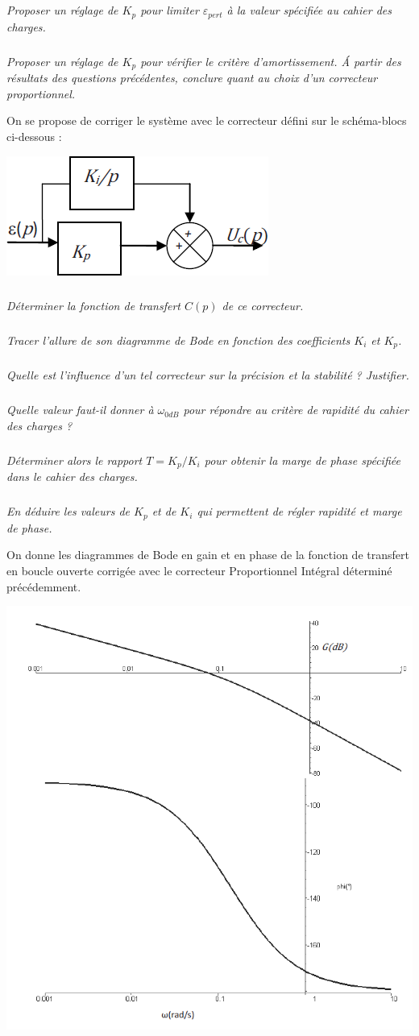 \documentclass[10pt,fleqn]{article} %
\begin{document}
\subparagraph{}
\textit{Proposer un réglage de $K_p$ pour limiter $\varepsilon_{pert}$ à la valeur spécifiée au cahier des charges.}

\subparagraph{}
\textit{Proposer un réglage de $K_p$ pour vérifier le critère d’amortissement. \'A partir des résultats des questions précédentes, conclure quant au choix d’un correcteur proportionnel.}

On se propose de corriger le système avec le correcteur défini sur le schéma-blocs ci-dessous :
\begin{center}
\includegraphics[width=.4\linewidth]{images_02/fig_07}
\end{center}


\subparagraph{}
\textit{Déterminer la fonction de transfert $C(p)$ de ce correcteur.}

\subparagraph{}
\textit{Tracer l’allure de son diagramme de Bode en fonction des coefficients $K_i$ et $K_p$.}

\subparagraph{}
\textit{Quelle est l’influence d’un tel correcteur sur la précision et la stabilité ? Justifier.}

\subparagraph{}
\textit{Quelle valeur faut-il donner à $\omega_{0dB}$ pour répondre au critère de rapidité du cahier des charges ?}

\subparagraph{}
\textit{Déterminer alors le rapport $T=K_p/K_i$ pour obtenir la marge de phase spécifiée dans le cahier des charges.}

\subparagraph{}
\textit{En déduire les valeurs de $K_p$ et de $K_i$ qui permettent de régler rapidité et marge de phase.}


On donne les diagrammes de Bode en gain et en phase de la fonction de transfert en boucle ouverte corrigée avec le correcteur Proportionnel Intégral déterminé précédemment.

\begin{center}
\includegraphics[width=.8\linewidth]{images_02/fig_08}
\end{center}
\end{document}
